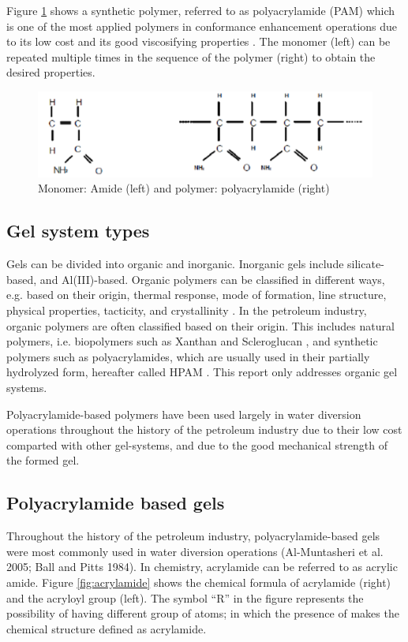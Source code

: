 Figure \ref{fig:polymonomer} shows a synthetic polymer, referred to as polyacrylamide (PAM) which is one of the most applied polymers in conformance enhancement operations due to its low cost and its good viscosifying properties \citep{Kabir2001}. The monomer (left) can be repeated multiple times in the sequence of the polymer (right) to obtain the desired properties.

\begin{figure}
    \centering
    \includegraphics[width=\textwidth]{img/fig/polymonomer.png}
    \caption{Monomer: Amide (left) and polymer: polyacrylamide (right) \citep{Kabir2001}}
    \label{fig:polymonomer} %
\end{figure}

\subsection{Gel system types}

Gels can be divided into organic and inorganic. Inorganic gels include silicate-based, and Al(III)-based. Organic polymers can be classified in different ways, e.g. based on their origin, thermal response, mode of formation, line structure, physical properties, tacticity, and crystallinity \citep{Ghosh2006}. In the petroleum industry, organic polymers are often classified based on their origin. This includes natural polymers, i.e. biopolymers such as Xanthan and Scleroglucan \citep{Al-Muntasheri2012}, and synthetic polymers such as polyacrylamides, which are usually used in their partially hydrolyzed form, hereafter called HPAM \citep{Finch1992}. This report only addresses organic gel systems.

Polyacrylamide-based polymers have been used largely in water diversion operations throughout the history of the petroleum industry due to their low cost comparted with other gel-systems, and due to the good mechanical strength of the formed gel. 

\subsection{Polyacrylamide based gels}
Throughout the history of the petroleum industry, polyacrylamide-based gels were most commonly used in water diversion operations \citep{Al-Muntasheri2005, Ball1984} (Al-Muntasheri et al. 2005; Ball and Pitts 1984). In chemistry, acrylamide can be referred to as acrylic amide. Figure \ref{fig:acrylamide} shows the chemical formula of acrylamide (right) and the acryloyl group (left). The symbol “R” in the figure represents the possibility of having different group of atoms; in which the presence of  makes the chemical structure defined as acrylamide.

